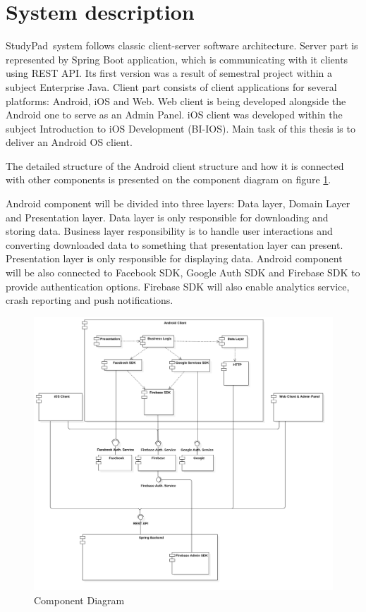 \documentclass[thesis=B,english]{FITthesis}[2012/10/20]
\newcommand{\appname}{StudyPad}
\begin{document}
\section{System description}

\appname\ system follows classic client-server software architecture. Server part is represented by Spring Boot application, which is communicating with it clients using REST API. Its first version was a result of semestral project within a subject Enterprise Java. Client part consists of client applications for several platforms: Android, iOS and Web. Web client is being developed alongside the Android one to serve as an Admin Panel. iOS client was developed within the subject Introduction to iOS Development (BI-IOS). Main task of this thesis is to deliver an Android OS client.

The detailed structure of the Android client structure and how it is connected with other components is presented on the component diagram on figure \ref{fig:component}. 

 Android component will be divided into three layers: Data layer, Domain Layer and Presentation layer. Data layer is only responsible for downloading and storing data. Business layer responsibility is to handle user interactions and converting downloaded data to something that presentation layer can present. Presentation layer is only responsible for displaying data. Android component will be also connected to Facebook SDK, Google Auth SDK and Firebase SDK to provide authentication options. Firebase SDK will also enable analytics service, crash reporting and push notifications.
\newpage
\begin{figure}[H]
  \includegraphics[scale=0.2]{deployment}
  \caption{Component Diagram}
  \label{fig:component}
\end{figure}
\end{document}
